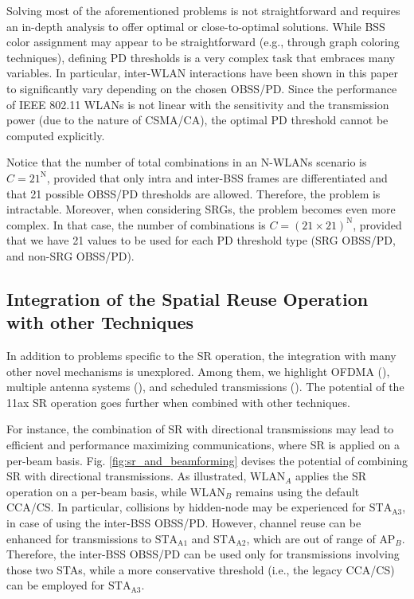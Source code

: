 \documentclass[preprint,12pt]{elsarticle}
\begin{document}
	Solving most of the aforementioned problems is not straightforward and requires an in-depth analysis to offer optimal or close-to-optimal solutions. While BSS color assignment may appear to be straightforward (e.g., through graph coloring techniques), defining PD thresholds is a very complex task that embraces many variables. In particular, inter-WLAN interactions have been shown in this paper to significantly vary depending on the chosen OBSS/PD. Since the performance of IEEE 802.11 WLANs is not linear with the sensitivity and the transmission power (due to the nature of CSMA/CA), the optimal PD threshold cannot be computed explicitly. 
	
	Notice that the number of total combinations in an N-WLANs scenario is $C = 21^\text{N}$, provided that only intra and inter-BSS frames are differentiated and that 21 possible OBSS/PD thresholds are allowed. Therefore, the problem is intractable. Moreover, when considering SRGs, the problem becomes even more complex. In that case, the number of combinations is $C = (21\times21)^\text{N}$, provided that we have 21 values to be used for each PD threshold type (SRG OBSS/PD, and non-SRG OBSS/PD).
	
	\subsection{Integration of the Spatial Reuse Operation with other Techniques}
	
	In addition to problems specific to the SR operation, the integration with many other novel mechanisms is unexplored. Among them, we highlight OFDMA (\citealp{bankov2018ofdma, dovelos2018optimal}), multiple antenna systems (\citealp{liao2016mu}), and scheduled transmissions (\citealp{nurchis2019target}). The potential of the 11ax SR operation goes further when combined with other techniques. 
	
	For instance, the combination of SR with directional transmissions may lead to efficient and performance maximizing communications, where SR is applied on a per-beam basis. Fig. \ref{fig:sr_and_beamforming} devises the potential of combining SR with directional transmissions. As illustrated, $\text{WLAN}_A$ applies the SR operation on a per-beam basis, while $\text{WLAN}_B$ remains using the default CCA/CS. In particular, collisions by hidden-node may be experienced for $\text{STA}_\text{A3}$, in case of using the inter-BSS OBSS/PD. However, channel reuse can be enhanced for transmissions to $\text{STA}_\text{A1}$ and $\text{STA}_\text{A2}$, which are out of range of $\text{AP}_B$. Therefore, the inter-BSS OBSS/PD can be used only for transmissions involving those two STAs, while a more conservative threshold (i.e., the legacy CCA/CS) can be employed for $\text{STA}_\text{A3}$.
	
\end{document}
